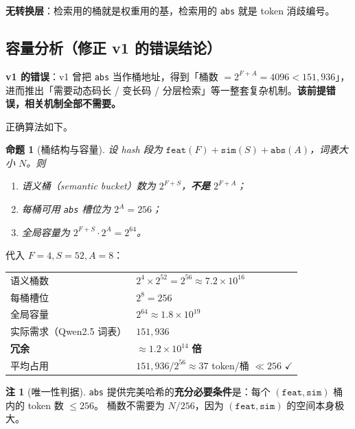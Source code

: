 \documentclass[11pt,a4paper]{ctexart}
\newcommand{\warn}[1]{\textcolor{warnred}{\textbf{#1}}}
\newcommand{\ok}[1]{\textcolor{okgreen}{\textbf{#1}}}
\newtheorem{proposition}{命题}
\theoremstyle{definition}
\newtheorem{remark}{注}
\begin{document}
\textbf{无转换层}：检索用的桶就是权重用的基，检索用的 \texttt{abs} 就是 token 消歧编号。

\subsection{容量分析（修正 v1 的错误结论）}\label{sec:capacity}

\warn{v1 的错误}：v1 曾把 \texttt{abs} 当作桶地址，得到「桶数 $=2^{F+A}=4096<151{,}936$」，
进而推出「需要动态码长 / 变长码 / 分层检索」等一整套复杂机制。\textbf{该前提错误，相关机制全部不需要。}

正确算法如下。

\begin{proposition}[桶结构与容量]
设 hash 段为 $\texttt{feat}(F)+\texttt{sim}(S)+\texttt{abs}(A)$，词表大小 $N$。则
\begin{enumerate}
\item 语义桶（semantic bucket）数为 $2^{F+S}$，\textbf{不是} $2^{F+A}$；
\item 每桶可用 \texttt{abs} 槽位为 $2^{A}=256$；
\item 全局容量为 $2^{F+S}\cdot 2^{A}=2^{64}$。
\end{enumerate}
\end{proposition}

代入 $F=4,S=52,A=8$：

\begin{center}
\begin{tabularx}{\textwidth}{@{}lX@{}}
\toprule
语义桶数 & $2^{4}\times 2^{52}=2^{56}\approx 7.2\times10^{16}$ \\
每桶槽位 & $2^{8}=256$ \\
全局容量 & $2^{64}\approx 1.8\times10^{19}$ \\
实际需求（Qwen2.5 词表） & $151{,}936$ \\
\textbf{冗余} & $\approx 1.2\times10^{14}$ \ok{倍} \\
平均占用 & $151{,}936/2^{56}\approx 37$ token/桶 $\ll 256$ \ok{$\checkmark$} \\
\bottomrule
\end{tabularx}
\end{center}

\begin{remark}[唯一性判据]
\texttt{abs} 提供完美哈希的\textbf{充分必要条件}是：每个 $(\texttt{feat},\texttt{sim})$ 桶内的 token 数 $\le 256$。
桶数不需要为 $N/256$，因为 $(\texttt{feat},\texttt{sim})$ 的空间本身极大。
\end{remark}
\end{document}
